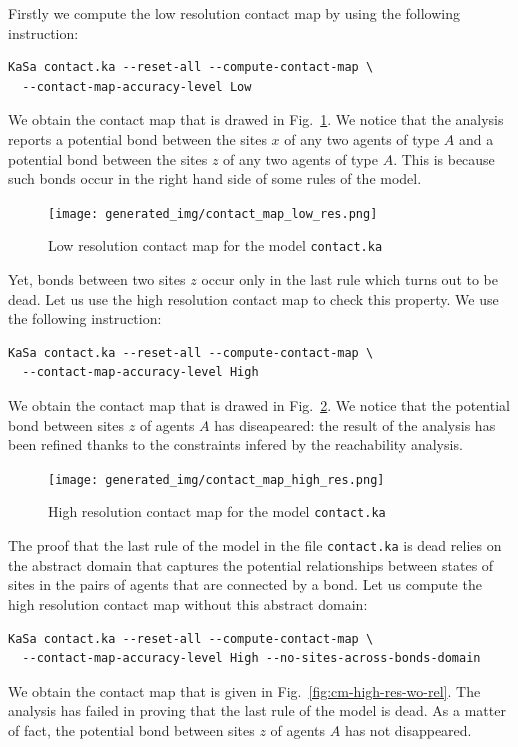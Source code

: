 \documentclass[11pt]{book}
\begin{document}
Firstly we compute the low resolution contact map by using the following instruction:
\begin{verbatim}
KaSa contact.ka --reset-all --compute-contact-map \
  --contact-map-accuracy-level Low
\end{verbatim}

We obtain the contact map that is drawed in Fig.~\ref{fig:cm-low-res}. We notice that the analysis reports a potential bond between the sites $x$ of any two agents of type $A$ and a potential bond between the sites $z$ of any two agents of type $A$. This is because such bonds occur in the right hand side of some rules of the model.


\begin{figure}[htbp]
\centering
\texttt{[image: generated\_img/contact\_map\_low\_res.png]}
\caption{Low resolution contact map for the model \texttt{contact.ka}}
\label{fig:cm-low-res}
\end{figure}

Yet, bonds between two sites $z$ occur only in the last rule which turns out to be dead. Let us use the  high resolution contact map to check this property. We use the following instruction:
\begin{verbatim}
KaSa contact.ka --reset-all --compute-contact-map \
  --contact-map-accuracy-level High
\end{verbatim}

We obtain the contact map that is drawed in Fig.~\ref{fig:cm-high-res}. We notice that the potential bond between sites $z$ of agents $A$ has diseapeared: the result of the analysis has been refined thanks to the constraints infered by the reachability analysis.

\begin{figure}[htbp]
\centering
\texttt{[image: generated\_img/contact\_map\_high\_res.png]}
\caption{High resolution contact map for the model \texttt{contact.ka}}
\label{fig:cm-high-res}
\end{figure}

The proof that the last rule of the model in the file \texttt{contact.ka} is dead relies on the abstract domain that captures the potential relationships between states of sites in the pairs of agents that are connected by a bond. Let us compute the high resolution contact map without this abstract domain:
\begin{verbatim}
KaSa contact.ka --reset-all --compute-contact-map \
  --contact-map-accuracy-level High --no-sites-across-bonds-domain
\end{verbatim}
We obtain the contact map that is given in Fig.~\ref{fig:cm-high-res-wo-rel}. The analysis has failed in proving that the last rule of the model is dead. As a matter of fact, the potential bond between sites $z$ of agents $A$ has not disappeared.
\end{document}
